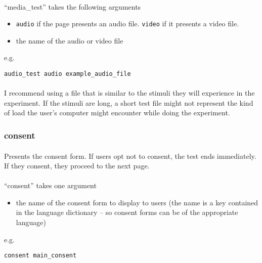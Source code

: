 \paragraph{}
``media\_test'' takes the following arguments

\begin{itemize}
\item \texttt{audio} if the page presents an audio file.  \texttt{video} if it presents a video file.
\item the name of the audio or video file
\end{itemize}

e.g.

\begin{lstlisting}
audio_test audio example_audio_file
\end{lstlisting}

\paragraph{}
I recommend using a file that is similar to the stimuli they will experience in the experiment.  If the stimuli are long, a short test file might not represent the kind of load the user's computer might encounter while doing the experiment.


\subsubsection{consent}

\paragraph{}
Presents the consent form.  If users opt not to consent, the test ends immediately.  If they consent, they proceed to the next page.

\paragraph{}
``consent'' takes one argument
\begin{itemize}
\item the name of the consent form to display to users (the name is a key contained in the language dictionary -- so consent forms can be of the appropriate language)
\end{itemize}

e.g.

\begin{lstlisting}
consent main_consent
\end{lstlisting}


